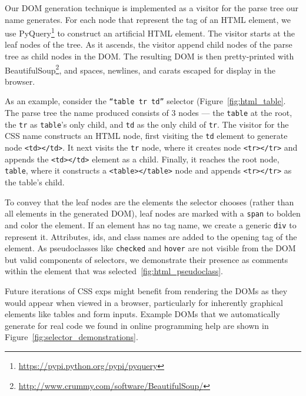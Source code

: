 Our DOM generation technique is implemented as a visitor for the parse tree our \gls{name} generates.
For each node that represent the tag of an HTML element, we use PyQuery\footnote{\url{https://pypi.python.org/pypi/pyquery}} to construct an artificial HTML element.
The visitor starts at the leaf nodes of the tree.
As it ascends, the visitor append child nodes of the parse tree as child nodes in the DOM.
The resulting DOM is then pretty-printed with BeautifulSoup\footnote{\url{http://www.crummy.com/software/BeautifulSoup/}}, and spaces, newlines, and carats escaped for display in the browser.

As an example, consider the \texttt{``table tr td''} selector (Figure~\ref{fig:html_table}.
The parse tree the \gls{name} produced consists of 3 nodes --- the \texttt{table} at the root, the \texttt{tr} as \texttt{table}'s only child, and \texttt{td} as the only child of \texttt{tr}.
The visitor for the CSS \gls{name} constructs an HTML node, first visiting the \texttt{td} element to generate node \texttt{<td></td>}.
It next visits the \texttt{tr} node, where it creates node \texttt{<tr></tr>} and appends the \texttt{<td></td>} element as a child.
Finally, it reaches the root node, \texttt{table}, where it constructs a \texttt{<table></table>} node and appends \texttt{<tr></tr>} as the table's child.

To convey that the leaf nodes are the elements the selector chooses (rather than all elements in the generated DOM), leaf nodes are marked with a \texttt{span} to bolden and color the element.
If an element has no tag name, we create a generic \texttt{div} to represent it.
Attributes, ids, and class names are added to the opening tag of the element.
As pseudoclasses like \texttt{checked} and \texttt{hover} are not visible from the DOM but valid components of selectors, we demonstrate their presence as comments within the element that was selected~\ref{fig:html_pseudoclass}.

Future iterations of CSS \glspl{exp} might benefit from rendering the DOMs as they would appear when viewed in a browser, particularly for inherently graphical elements like tables and form inputs.
Example DOMs that we automatically generate for real code we found in online programming help are shown in Figure~\ref{fig:selector_demonstrations}.
\fi

